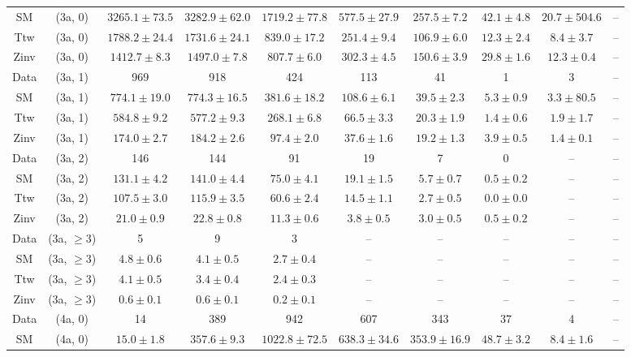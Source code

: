 \begin{table}[h!]
{\begin{tabular}{cccccccccc}
	SM & (3a, 0) & $3265.1\pm 73.5$ & $3282.9\pm 62.0$ & $1719.2\pm 77.8$ & $577.5\pm 27.9$ & $257.5\pm 7.2$ & $42.1\pm 4.8$ & $20.7\pm 504.6$ & -- \\[0.5ex] 
	Ttw & (3a, 0) & $1788.2\pm 24.4$ & $1731.6\pm 24.1$ & $839.0\pm 17.2$ & $251.4\pm 9.4$ & $106.9\pm 6.0$ & $12.3\pm 2.4$ & $8.4\pm 3.7$ & -- \\[0.5ex] 
	Zinv & (3a, 0) & $1412.7\pm 8.3$ & $1497.0\pm 7.8$ & $807.7\pm 6.0$ & $302.3\pm 4.5$ & $150.6\pm 3.9$ & $29.8\pm 1.6$ & $12.3\pm 0.4$ & -- \\[0.5ex] 
	Data & (3a, 1) & 969 & 918 & 424 & 113 & 41 & 1 & 3 & -- \\[0.5ex] 
	SM & (3a, 1) & $774.1\pm 19.0$ & $774.3\pm 16.5$ & $381.6\pm 18.2$ & $108.6\pm 6.1$ & $39.5\pm 2.3$ & $5.3\pm 0.9$ & $3.3\pm 80.5$ & -- \\[0.5ex] 
	Ttw & (3a, 1) & $584.8\pm 9.2$ & $577.2\pm 9.3$ & $268.1\pm 6.8$ & $66.5\pm 3.3$ & $20.3\pm 1.9$ & $1.4\pm 0.6$ & $1.9\pm 1.7$ & -- \\[0.5ex] 
	Zinv & (3a, 1) & $174.0\pm 2.7$ & $184.2\pm 2.6$ & $97.4\pm 2.0$ & $37.6\pm 1.6$ & $19.2\pm 1.3$ & $3.9\pm 0.5$ & $1.4\pm 0.1$ & -- \\[0.5ex] 
	Data & (3a, 2) & 146 & 144 & 91 & 19 & 7 & 0 & -- & -- \\[0.5ex] 
	SM & (3a, 2) & $131.1\pm 4.2$ & $141.0\pm 4.4$ & $75.0\pm 4.1$ & $19.1\pm 1.5$ & $5.7\pm 0.7$ & $0.5\pm 0.2$ & -- & -- \\[0.5ex] 
	Ttw & (3a, 2) & $107.5\pm 3.0$ & $115.9\pm 3.5$ & $60.6\pm 2.4$ & $14.5\pm 1.1$ & $2.7\pm 0.5$ & $0.0\pm 0.0$ & -- & -- \\[0.5ex] 
	Zinv & (3a, 2) & $21.0\pm 0.9$ & $22.8\pm 0.8$ & $11.3\pm 0.6$ & $3.8\pm 0.5$ & $3.0\pm 0.5$ & $0.5\pm 0.2$ & -- & -- \\[0.5ex] 
	Data & (3a, $\ge3$) & 5 & 9 & 3 & -- & -- & -- & -- & -- \\[0.5ex] 
	SM & (3a, $\ge3$) & $4.8\pm 0.6$ & $4.1\pm 0.5$ & $2.7\pm 0.4$ & -- & -- & -- & -- & -- \\[0.5ex] 
	Ttw & (3a, $\ge3$) & $4.1\pm 0.5$ & $3.4\pm 0.4$ & $2.4\pm 0.3$ & -- & -- & -- & -- & -- \\[0.5ex] 
	Zinv & (3a, $\ge3$) & $0.6\pm 0.1$ & $0.6\pm 0.1$ & $0.2\pm 0.1$ & -- & -- & -- & -- & -- \\[0.5ex] 
	Data & (4a, 0) & 14 & 389 & 942 & 607 & 343 & 37 & 4 & -- \\[0.5ex] 
	SM & (4a, 0) & $15.0\pm 1.8$ & $357.6\pm 9.3$ & $1022.8\pm 72.5$ & $638.3\pm 34.6$ & $353.9\pm 16.9$ & $48.7\pm 3.2$ & $8.4\pm 1.6$ & -- \\[0.5ex] 

\end{tabular}}
\end{table}
